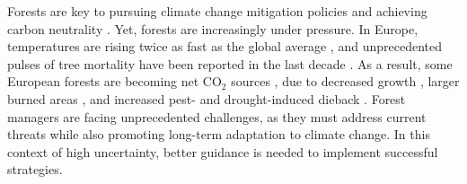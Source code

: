 \documentclass[11pt,letter]{article}
\begin{document}

Forests are key to pursuing climate change mitigation policies and achieving carbon neutrality  \citep{Korosuo2023, Hyyrynen2023}. Yet, forests are increasingly under pressure. In Europe, temperatures are rising twice as fast as the global average \citep{CCCS2024}, and unprecedented pulses of tree mortality  have been reported in the last decade \citep{Senf2020}. As a result, some European forests are becoming net CO$_2$ sources \citep{Hadden2016, Karelin2021}, due to decreased growth \citep{Hadden2016, Woude2023}, larger burned areas \citep{Carnicer2022, Kelly2024}, and increased pest- and drought-induced dieback \citep{Karelin2021, Cienciala2024, Latifovic2024}. Forest managers are facing unprecedented challenges, as they must address current threats while also promoting long-term adaptation to climate change. In this context of high uncertainty, better guidance is needed to implement successful strategies.
\end{document}
